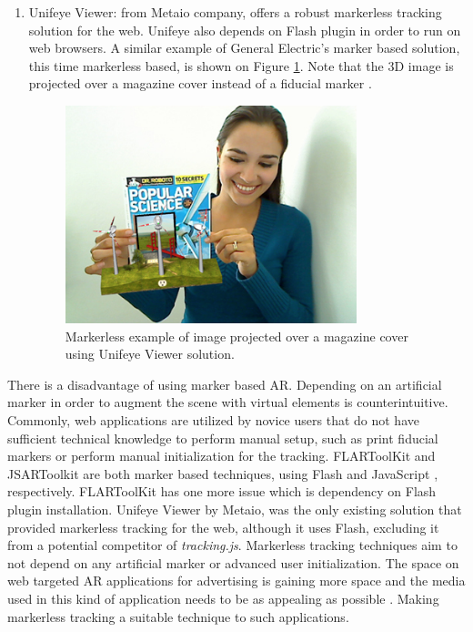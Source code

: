 \begin{enumerate}
    \item Unifeye Viewer: from Metaio company, offers a robust markerless tracking solution for the web. Unifeye \cite{Metaio2009} also depends on Flash \cite{Flash2013} plugin in order to run on web browsers. A similar example of General Electric's marker based solution, this time markerless based, is shown on Figure \ref{figure:unifeyeviewer}. Note that the 3D image is projected over a magazine cover instead of a fiducial marker \cite{Cho1998}.

    \begin{figure}[!htb]
      \centering
      \includegraphics[width=240pt]{chapters/tracking_library_for_the_web/unifeyeviewer.png}
      \caption{Markerless example of image projected over a magazine cover using Unifeye Viewer solution.}
      \label{figure:unifeyeviewer}
    \end{figure}
\end{enumerate}

There is a disadvantage of using marker based AR. Depending on an artificial marker in order to augment the scene with virtual elements is counterintuitive. Commonly, web applications are utilized by novice users that do not have sufficient technical knowledge to perform manual setup, such as print fiducial markers or perform manual initialization for the tracking. FLARToolKit \cite{Yan2011} and JSARToolkit \cite{JSARToolkit2011} are both marker based techniques, using Flash \cite{Flash2013} and JavaScript \cite{International2009}, respectively. FLARToolKit has one more issue which is dependency on Flash plugin installation. Unifeye Viewer by Metaio, was the only existing solution that provided markerless tracking for the web, although it uses Flash, excluding it from a potential competitor of \textit{tracking.js}. Markerless tracking techniques aim to not depend on any artificial marker or advanced user initialization. The space on web targeted AR applications for advertising is gaining more space and the media used in this kind of application needs to be as appealing as possible \cite{Pablo2013}. Making markerless tracking a suitable technique to such applications.

